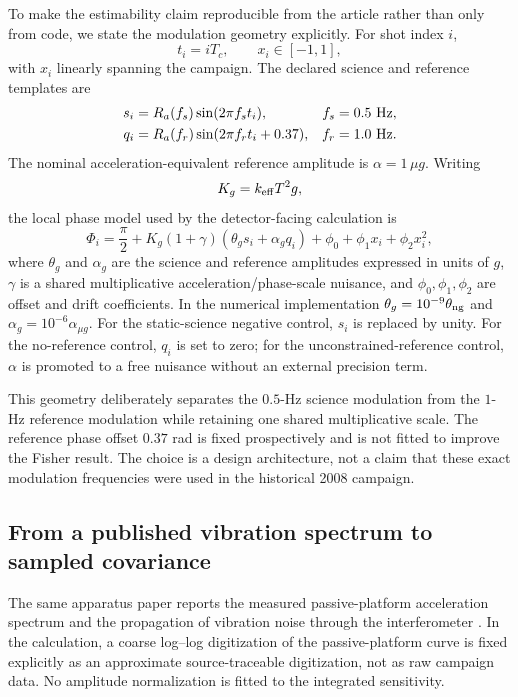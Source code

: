 To make the estimability claim reproducible from the article rather than only from code, we state the modulation geometry explicitly. For shot index $i$,
\begin{equation}
t_i=iT_c,\qquad x_i\in[-1,1],
\end{equation}
with $x_i$ linearly spanning the campaign. The declared science and reference templates are
\begin{align}
s_i&=R_a(f_s)\sin(2\pi f_s t_i), & f_s&=0.5\ {\rm Hz},\\
q_i&=R_a(f_r)\sin(2\pi f_r t_i+0.37), & f_r&=1.0\ {\rm Hz}.
\label{eq:templates}
\end{align}
The nominal acceleration-equivalent reference amplitude is $\alpha=1\,\mu g$. Writing
\begin{equation}
K_g=k_{\rm eff}T^2g,
\end{equation}
the local phase model used by the detector-facing calculation is
\begin{equation}
\Phi_i=\frac{\pi}{2}+K_g(1+\gamma)
\left(\theta_g s_i+\alpha_g q_i\right)
+\phi_0+\phi_1x_i+\phi_2x_i^2,
\label{eq:phase-model}
\end{equation}
where $\theta_g$ and $\alpha_g$ are the science and reference amplitudes expressed in units of $g$, $\gamma$ is a shared multiplicative acceleration/phase-scale nuisance, and $\phi_0,\phi_1,\phi_2$ are offset and drift coefficients. In the numerical implementation $\theta_g=10^{-9}\theta_{\rm ng}$ and $\alpha_g=10^{-6}\alpha_{\mu g}$. For the static-science negative control, $s_i$ is replaced by unity. For the no-reference control, $q_i$ is set to zero; for the unconstrained-reference control, $\alpha$ is promoted to a free nuisance without an external precision term.

This geometry deliberately separates the $0.5$-Hz science modulation from the $1$-Hz reference modulation while retaining one shared multiplicative scale. The reference phase offset $0.37$ rad is fixed prospectively and is not fitted to improve the Fisher result. The choice is a design architecture, not a claim that these exact modulation frequencies were used in the historical 2008 campaign.

\subsection{From a published vibration spectrum to sampled covariance}

The same apparatus paper reports the measured passive-platform acceleration spectrum and the propagation of vibration noise through the interferometer \cite{LeGouet2008}. In the calculation, a coarse log--log digitization of the passive-platform curve is fixed explicitly as an approximate source-traceable digitization, not as raw campaign data. No amplitude normalization is fitted to the integrated sensitivity.

